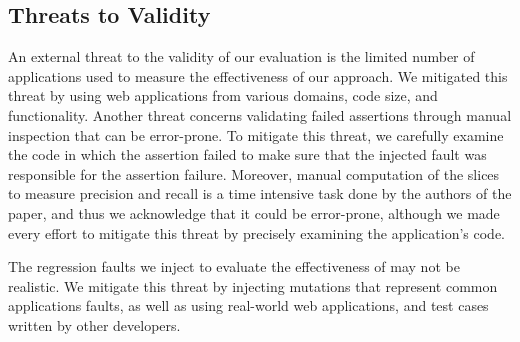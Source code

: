 \subsection{Threats to Validity} \label{Sec:threatsToValidity}
An external threat to the validity of our evaluation is the limited number of \javascript applications used to measure the effectiveness of our approach. We mitigated this threat by using web applications from various domains, code size, and functionality. Another threat concerns validating failed assertions through manual inspection that can be error-prone. To mitigate this threat, we carefully examine the code in which the assertion failed to make sure that the injected fault was responsible for the assertion failure. Moreover, manual computation of the \javascript slices to measure precision and recall is a time intensive task done by the authors of the paper, and thus we acknowledge that it could be error-prone, although we made every effort to mitigate this threat by precisely examining the application's code.

The regression faults we inject to evaluate the effectiveness of \tool may not be realistic. We mitigate this threat by injecting mutations that represent common \javascript applications faults, as well as using real-world web applications, and test cases written by other developers.
